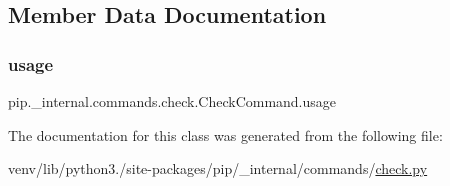 \subsection{Member Data Documentation}
\mbox{\label{classpip_1_1__internal_1_1commands_1_1check_1_1CheckCommand_a6f45ee91585e4679ad01411976d269ab}} 
\subsubsection{\texorpdfstring{usage}{usage}}
{\footnotesize\ttfamily pip.\+\_\+internal.\+commands.\+check.\+Check\+Command.\+usage\hspace{0.3cm}{\ttfamily [static]}}



The documentation for this class was generated from the following file\+:\begin{DoxyCompactItemize}
\item 
venv/lib/python3./site-\/packages/pip/\+\_\+internal/commands/\hyperlink{pip_2__internal_2commands_2check_8py}{check.\+py}\end{DoxyCompactItemize}

